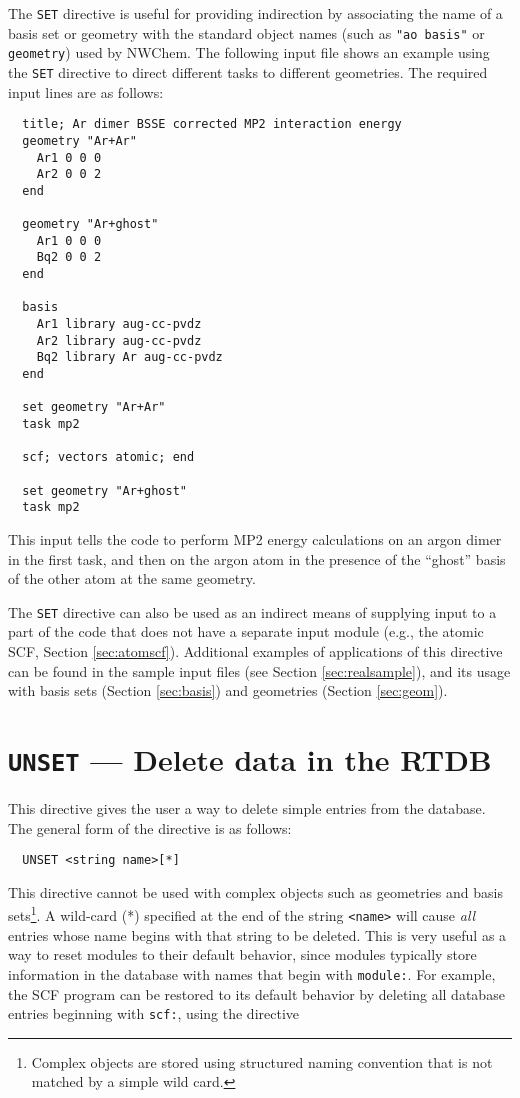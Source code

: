 The \verb+SET+ directive is useful for providing indirection by
associating the name of a basis set or geometry with the standard
object names (such as \verb+"ao basis"+ or \verb+geometry+) used by
NWChem.  The following input file shows an example using the
\verb+SET+ directive to direct different tasks to different
geometries.  The required input lines are as follows:

\begin{verbatim}
  title; Ar dimer BSSE corrected MP2 interaction energy
  geometry "Ar+Ar"
    Ar1 0 0 0
    Ar2 0 0 2
  end

  geometry "Ar+ghost"
    Ar1 0 0 0
    Bq2 0 0 2
  end

  basis
    Ar1 library aug-cc-pvdz
    Ar2 library aug-cc-pvdz
    Bq2 library Ar aug-cc-pvdz
  end

  set geometry "Ar+Ar"
  task mp2 

  scf; vectors atomic; end

  set geometry "Ar+ghost"
  task mp2 
\end{verbatim}

This input tells the code to perform MP2 energy calculations 
on an argon dimer in the first task, and then
on the argon atom in the presence of the ``ghost'' basis of the other
atom at the same geometry.

The \verb+SET+ directive can also be used as an indirect means of
supplying input to a part of the code that does not have a separate
input module (e.g., the atomic SCF, Section \ref{sec:atomscf}).
Additional examples of applications of this directive can be found in
the sample input files (see Section \ref{sec:realsample}), and
its usage with basis sets (Section \ref{sec:basis}) and geometries
(Section \ref{sec:geom}).

\section{{\tt UNSET} --- Delete data in the RTDB}
\label{sec:unset}

This directive gives the user a way to delete simple entries from the
database.  The general form of the directive is as follows:

\begin{verbatim}
  UNSET <string name>[*]
\end{verbatim}

This directive cannot be used with complex objects such as geometries
and basis sets\footnote{Complex objects are stored using structured
  naming convention that is not matched by a simple wild card.}.  A
wild-card (*) specified at the end of the string \verb+<name>+ will
cause {\em all} entries whose name begins with that string to be
deleted.  This is very useful as a way to reset modules to their
default behavior, since modules typically store information in the
database with names that begin with \verb+module:+.  For example, the
SCF program can be restored to its default behavior by deleting all
database entries beginning with \verb+scf:+, using the directive

